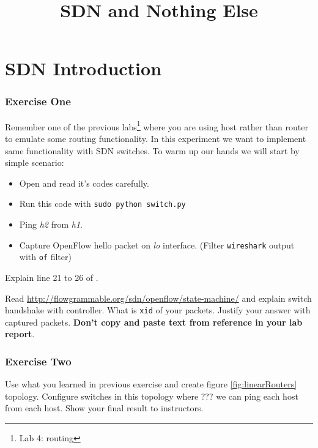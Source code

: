 \documentclass{../UTNetLab}
\title{SDN and Nothing Else}
\begin{document}
\part{SDN Introduction}
    \section{Exercise One}
    Remember one of the previous labs\footnote{Lab 4: routing} where you are using host rather than router to emulate some routing functionality. In this experiment we want to implement same functionality with SDN switches. To warm up our hands we will start by simple scenario:

    \begin{itemize}
        \item Open  and read it's codes carefully.
        \item Run this code with \lstinline{sudo python switch.py}
        \item Ping \textit{h2} from \textit{h1}.
        \item Capture OpenFlow hello packet on \textit{lo} interface. (Filter \lstinline{wireshark} output with \lstinline{of} filter)
    \end{itemize}

    \begin{report}
    \item Explain line 21 to 26 of .
    \item Read \url{http://flowgrammable.org/sdn/openflow/state-machine/} and explain switch handshake with controller. What is \texttt{xid} of your packets. Justify your answer with captured packets. \textbf{Don't copy and paste text from reference in your lab report}.
    \end{report}

    \section{Exercise Two}
    Use what you learned in previous exercise and create figure \ref{fig:linearRouters} topology. Configure switches in this topology where ??? we can ping each host from each host. Show your final result to instructors.
\end{document}
